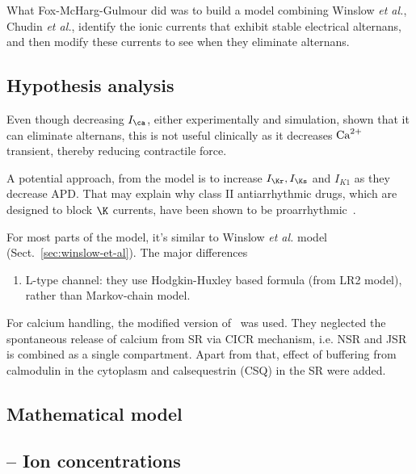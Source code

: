What Fox-McHarg-Gulmour did was to build a model combining Winslow
{\it et al.}, Chudin {\it et al.}, identify the ionic currents
that exhibit stable electrical alternans, and then modify these
currents to see when they eliminate alternans.

\subsection{Hypothesis analysis}
\label{sec:hypothesis-analysis-14}

Even though decreasing $I_\ca$, either experimentally and simulation,
shown that it can eliminate alternans, this is not useful clinically
as it decreases ${\text{Ca}^{2+}}$ transient, thereby reducing contractile force.

A potential approach, from the model is to increase $I_\Kr,I_\Ks$
and $I_{K1}$ as they decrease APD. That may explain why class II
antiarrhythmic drugs, which are designed to block $\K$ currents, have
been shown to be proarrhythmic~\citep{Peters2000}.

For most parts of the model, it's similar to Winslow {\it et al.}
model (Sect.~\ref{sec:winslow-et-al}). The major differences
\begin{enumerate}
\item L-type channel: they use Hodgkin-Huxley based formula (from LR2
  model), rather than Markov-chain model.
\end{enumerate}

For calcium handling, the modified version of~\citep{chudin1999icd}
was used. They neglected the spontaneous release of calcium from SR
via CICR mechanism, i.e. NSR and JSR is combined as a single
compartment. Apart from that, effect of buffering from calmodulin in
the cytoplasm and calsequestrin (CSQ) in the SR were added.

\subsection{Mathematical model}
\label{sec:mathematical-models}

\subsection{-- Ion concentrations}

